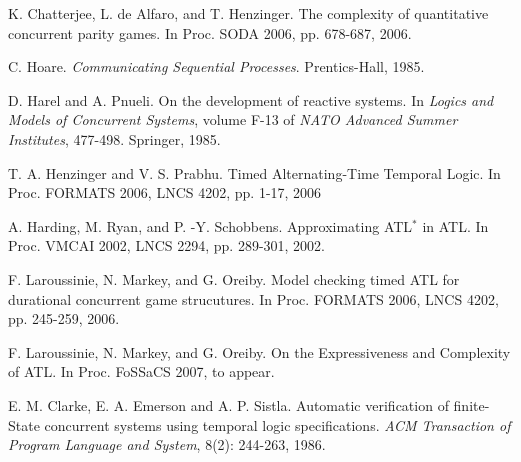 \documentclass[times, 10 pt,twocolumn]{article}
\begin{document}
\begin{thebibliography}{00}
 K. Chatterjee, L. de Alfaro, and T. Henzinger.
The complexity of quantitative concurrent parity games. In Proc.
SODA 2006, pp. 678-687, 2006.


 C. Hoare. \emph{Communicating Sequential
Processes}. Prentics-Hall, 1985.

 D. Harel and A. Pnueli. On the development of
reactive systems. In \emph{Logics and Models of Concurrent
Systems}, volume F-13 of \emph{NATO Advanced Summer Institutes},
477-498. Springer, 1985.

 T. A. Henzinger and V. S. Prabhu. Timed Alternating-Time
Temporal Logic. In Proc. FORMATS 2006, LNCS 4202, pp. 1-17, 2006


A. Harding, M. Ryan, and P. -Y. Schobbens. Approximating ATL$^*$
in ATL. In Proc. VMCAI 2002, LNCS 2294, pp. 289-301, 2002.

 F. Laroussinie, N. Markey, and G. Oreiby.
Model checking timed ATL for durational concurrent game
strucutures. In Proc. FORMATS 2006, LNCS 4202, pp. 245-259, 2006.

F. Laroussinie, N. Markey, and G. Oreiby. On the Expressiveness
and Complexity of ATL. In Proc. FoSSaCS 2007, to appear.




%


%
 E. M. Clarke, E. A. Emerson and A. P. Sistla. Automatic
verification of finite-State concurrent systems using temporal
logic specifications. \emph{ACM Transaction of  Program Language
and System}, 8(2): 244-263, 1986.
%
%
%
%


\end{thebibliography}
\end{document}
